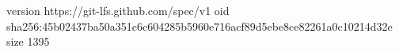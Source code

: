version https://git-lfs.github.com/spec/v1
oid sha256:45b02437ba50a351c6c604285b5960e716acf89d5ebe8ce82261a0c10214d32e
size 1395
